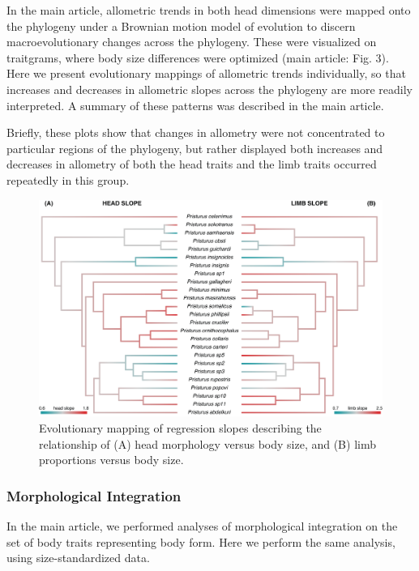 \documentclass[
  11pt,
]{article}
\begin{document}
In the main article, allometric trends in both head dimensions were
mapped onto the phylogeny under a Brownian motion model of evolution to
discern macroevolutionary changes across the phylogeny. These were
visualized on traitgrams, where body size differences were optimized
(main article: Fig. 3). Here we present evolutionary mappings of
allometric trends individually, so that increases and decreases in
allometric slopes across the phylogeny are more readily interpreted. A
summary of these patterns was described in the main article.

Briefly, these plots show that changes in allometry were not
concentrated to particular regions of the phylogeny, but rather
displayed both increases and decreases in allometry of both the head
traits and the limb traits occurred repeatedly in this group.

\begin{figure}[H]

{\centering \includegraphics[width=1\linewidth]{Figs/contmap_slopes} 

}

\caption{Evolutionary mapping of regression slopes describing the relationship of (A) head morphology versus body size, and (B) limb proportions versus body size.}\label{fig:unnamed-chunk-6}
\end{figure}

\newpage

\hypertarget{morphological-integration}{%
\subsubsection{Morphological
Integration}\label{morphological-integration}}

In the main article, we performed analyses of morphological integration
on the set of body traits representing body form. Here we perform the
same analysis, using size-standardized data.
\end{document}

